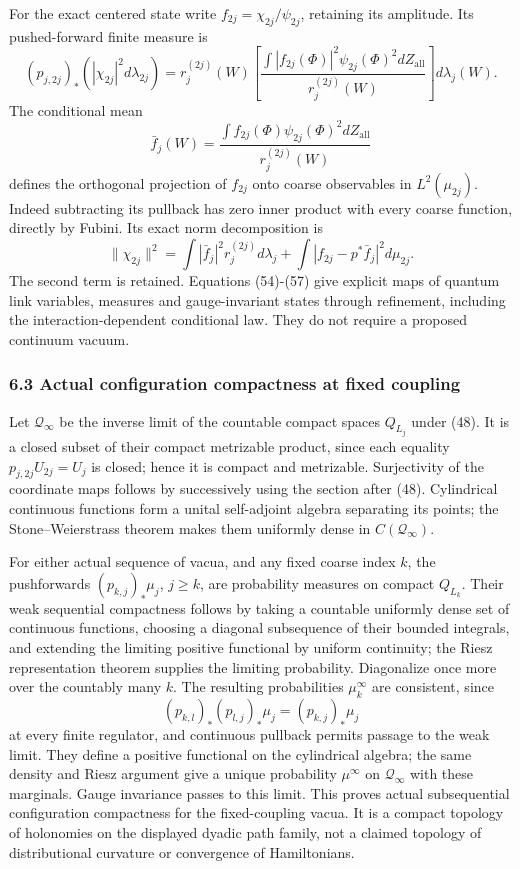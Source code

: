 \documentclass[
  11pt,
]{article}
\begin{document}
For the exact centered state write \(f_{2j}=\chi_{2j}/\psi_{2j}\),
retaining its amplitude. Its pushed-forward finite measure is \[
 (p_{j,2j})_*(|\chi_{2j}|^2d\lambda_{2j})
 =r_j^{(2j)}(W)
 \left[\frac{\int |f_{2j}(\Phi)|^2\psi_{2j}(\Phi)^2dZ_{\mathrm{all}}}
 {r_j^{(2j)}(W)}\right]d\lambda_j(W).
\tag{56}
\] The conditional mean \[
 \bar f_j(W)=\frac{\int f_{2j}(\Phi)\psi_{2j}(\Phi)^2dZ_{\mathrm{all}}}
 {r_j^{(2j)}(W)}
\] defines the orthogonal projection of \(f_{2j}\) onto coarse
observables in \(L^2(\mu_{2j})\). Indeed subtracting its pullback has
zero inner product with every coarse function, directly by Fubini. Its
exact norm decomposition is \[
 \|\chi_{2j}\|^2
 =\int |\bar f_j|^2r_j^{(2j)}d\lambda_j
 +\int|f_{2j}-p^*\bar f_j|^2d\mu_{2j}.
\tag{57}
\] The second term is retained. Equations (54)-(57) give explicit maps
of quantum link variables, measures and gauge-invariant states through
refinement, including the interaction-dependent conditional law. They do
not require a proposed continuum vacuum.

\subsubsection{6.3 Actual configuration compactness at fixed
coupling}\label{actual-configuration-compactness-at-fixed-coupling}

Let \(\mathcal Q_\infty\) be the inverse limit of the countable compact
spaces \(Q_{L_j}\) under (48). It is a closed subset of their compact
metrizable product, since each equality \(p_{j,2j}U_{2j}=U_j\) is
closed; hence it is compact and metrizable. Surjectivity of the
coordinate maps follows by successively using the section after (48).
Cylindrical continuous functions form a unital self-adjoint algebra
separating its points; the Stone--Weierstrass theorem makes them
uniformly dense in \(C(\mathcal Q_\infty)\).

For either actual sequence of vacua, and any fixed coarse index \(k\),
the pushforwards \((p_{k,j})_*\mu_j\), \(j\ge k\), are probability
measures on compact \(Q_{L_k}\). Their weak sequential compactness
follows by taking a countable uniformly dense set of continuous
functions, choosing a diagonal subsequence of their bounded integrals,
and extending the limiting positive functional by uniform continuity;
the Riesz representation theorem supplies the limiting probability.
Diagonalize once more over the countably many \(k\). The resulting
probabilities \(\mu_k^\infty\) are consistent, since \[
 (p_{k,l})_* (p_{l,j})_*\mu_j=(p_{k,j})_*\mu_j
\] at every finite regulator, and continuous pullback permits passage to
the weak limit. They define a positive functional on the cylindrical
algebra; the same density and Riesz argument give a unique probability
\(\mu^\infty\) on \(\mathcal Q_\infty\) with these marginals. Gauge
invariance passes to this limit. This proves actual subsequential
configuration compactness for the fixed-coupling vacua. It is a compact
topology of holonomies on the displayed dyadic path family, not a
claimed topology of distributional curvature or convergence of
Hamiltonians.
\end{document}

